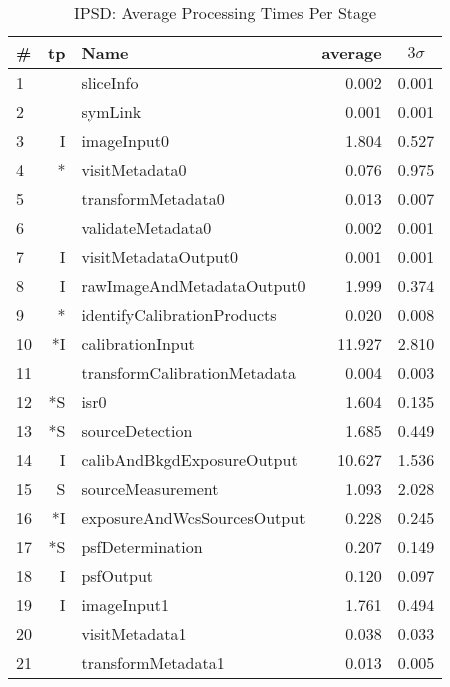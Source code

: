 \begin{table}[p]
\begin{center}
\small
\caption{IPSD: Average Processing Times Per Stage
\label{tbl:visitstats}}
\vspace{\baselineskip}
\begin{tabular}{lrlrr}
\hline\hline
\# & tp & Name & \multicolumn{1}{c}{average}&\multicolumn{1}{c}{$3\sigma$} \\ 
\hline
 1 &    &                     sliceInfo &  0.002 &  0.001 \\
 2 &    &                       symLink &  0.001 &  0.001 \\
 3 &  I &                   imageInput0 &  1.804 &  0.527 \\
 4 & *\phantom{I} &                visitMetadata0 &  0.076 &  0.975 \\
 5 &    &            transformMetadata0 &  0.013 &  0.007 \\
 6 &    &             validateMetadata0 &  0.002 &  0.001 \\
 7 &  I &          visitMetadataOutput0 &  0.001 &  0.001 \\
 8 &  I &    rawImageAndMetadataOutput0 &  1.999 &  0.374 \\
 9 & *\phantom{I}  &   identifyCalibrationProducts &  0.020 &  0.008 \\
10 & *I &              calibrationInput & 11.927 &  2.810 \\
11 &    &  transformCalibrationMetadata &  0.004 &  0.003 \\
12 & *S &                          isr0 &  1.604 &  0.135 \\
13 & *S &               sourceDetection &  1.685 &  0.449 \\
14 &  I &    calibAndBkgdExposureOutput & 10.627 &  1.536 \\
15 &  S &             sourceMeasurement &  1.093 &  2.028 \\
16 & *I &   exposureAndWcsSourcesOutput &  0.228 &  0.245 \\
17 & *S &              psfDetermination &  0.207 &  0.149 \\
18 &  I &                     psfOutput &  0.120 &  0.097 \\
19 &  I &                   imageInput1 &  1.761 &  0.494 \\
20 &    &                visitMetadata1 &  0.038 &  0.033 \\
21 &    &            transformMetadata1 &  0.013 &  0.005 \\

\end{tabular}
\end{center}
\end{table}
